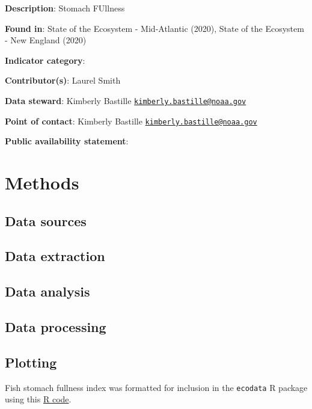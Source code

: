 \documentclass[
]{book}
\begin{document}
\textbf{Description}: Stomach FUllness

\textbf{Found in}: State of the Ecosystem - Mid-Atlantic (2020), State of the Ecosystem - New England (2020)

\textbf{Indicator category}:

\textbf{Contributor(s)}: Laurel Smith

\textbf{Data steward}: Kimberly Bastille \href{mailto:kimberly.bastille@noaa.gov}{\nolinkurl{kimberly.bastille@noaa.gov}}

\textbf{Point of contact}: Kimberly Bastille \href{mailto:kimberly.bastille@noaa.gov}{\nolinkurl{kimberly.bastille@noaa.gov}}

\textbf{Public availability statement}:

\hypertarget{methods-39}{%
\section{Methods}\label{methods-39}}

\hypertarget{data-sources-39}{%
\subsection{Data sources}\label{data-sources-39}}

\hypertarget{data-extraction-31}{%
\subsection{Data extraction}\label{data-extraction-31}}

\hypertarget{data-analysis-37}{%
\subsection{Data analysis}\label{data-analysis-37}}

\hypertarget{data-processing-28}{%
\subsection{Data processing}\label{data-processing-28}}

\hypertarget{plotting-32}{%
\subsection{Plotting}\label{plotting-32}}

Fish stomach fullness index was formatted for inclusion in the \texttt{ecodata} R package using this \href{https://github.com/NOAA-EDAB/ecodata/blob/master/data-raw/get_stom_fullness.R}{R code}.
\end{document}
